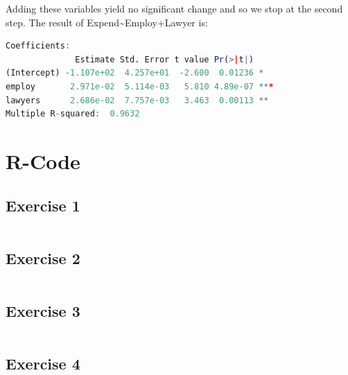 \documentclass{article}
\begin{document}
    Adding these variables yield no significant change and so we stop at the second step.
    The result of Expend\textasciitilde Employ+Lawyer is:\\
    \begin{lstlisting}[language=R]
Coefficients:
              Estimate Std. Error t value Pr(>|t|)    
(Intercept) -1.107e+02  4.257e+01  -2.600  0.01236 *  
employ       2.971e-02  5.114e-03   5.810 4.89e-07 ***
lawyers      2.686e-02  7.757e-03   3.463  0.00113 ** 
Multiple R-squared:  0.9632
    \end{lstlisting}
    
  \section{R-Code}
    \subsection{Exercise 1}\label{sec:RE1}
      \begin{lstlisting}[language=R]
      \end{lstlisting}
    \subsection{Exercise 2}\label{sec:RE2}
      \begin{lstlisting}[language=R]
      \end{lstlisting}
    \subsection{Exercise 3}\label{sec:RE3}
      \begin{lstlisting}[language=R]
      \end{lstlisting}
    \subsection{Exercise 4}\label{sec:RE4}
      \begin{lstlisting}[language=R]
      \end{lstlisting}
\end{document}
